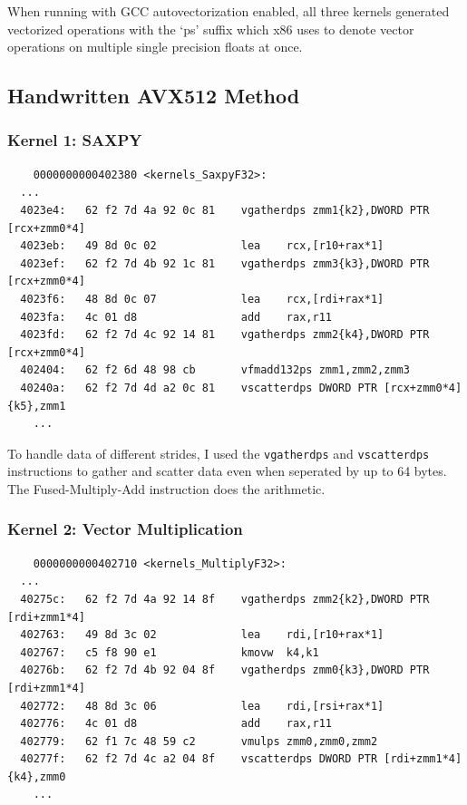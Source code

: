 \documentclass[11pt]{article}
\begin{document}
When running with GCC autovectorization enabled, all three kernels generated vectorized operations with the `ps' suffix
which x86 uses to denote vector operations on multiple single precision floats at once.

\subsection{Handwritten AVX512 Method}

\subsubsection{Kernel 1: SAXPY}

\begin{verbatim}
	0000000000402380 <kernels_SaxpyF32>:
  ...
  4023e4:	62 f2 7d 4a 92 0c 81 	vgatherdps zmm1{k2},DWORD PTR [rcx+zmm0*4]
  4023eb:	49 8d 0c 02          	lea    rcx,[r10+rax*1]
  4023ef:	62 f2 7d 4b 92 1c 81 	vgatherdps zmm3{k3},DWORD PTR [rcx+zmm0*4]
  4023f6:	48 8d 0c 07          	lea    rcx,[rdi+rax*1]
  4023fa:	4c 01 d8             	add    rax,r11
  4023fd:	62 f2 7d 4c 92 14 81 	vgatherdps zmm2{k4},DWORD PTR [rcx+zmm0*4]
  402404:	62 f2 6d 48 98 cb    	vfmadd132ps zmm1,zmm2,zmm3
  40240a:	62 f2 7d 4d a2 0c 81 	vscatterdps DWORD PTR [rcx+zmm0*4]{k5},zmm1
	...
\end{verbatim}

To handle data of different strides, I used the \texttt{vgatherdps} and \texttt{vscatterdps} instructions to gather and
scatter data even when seperated by up to 64 bytes. The Fused-Multiply-Add instruction does the arithmetic.

\subsubsection{Kernel 2: Vector Multiplication}

\begin{verbatim}
	0000000000402710 <kernels_MultiplyF32>:
  ...
  40275c:	62 f2 7d 4a 92 14 8f 	vgatherdps zmm2{k2},DWORD PTR [rdi+zmm1*4]
  402763:	49 8d 3c 02          	lea    rdi,[r10+rax*1]
  402767:	c5 f8 90 e1          	kmovw  k4,k1
  40276b:	62 f2 7d 4b 92 04 8f 	vgatherdps zmm0{k3},DWORD PTR [rdi+zmm1*4]
  402772:	48 8d 3c 06          	lea    rdi,[rsi+rax*1]
  402776:	4c 01 d8             	add    rax,r11
  402779:	62 f1 7c 48 59 c2    	vmulps zmm0,zmm0,zmm2
  40277f:	62 f2 7d 4c a2 04 8f 	vscatterdps DWORD PTR [rdi+zmm1*4]{k4},zmm0
	...
\end{verbatim}
\end{document}
